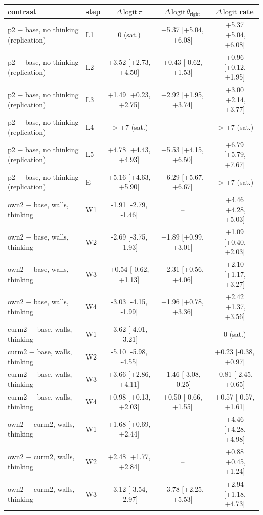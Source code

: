 \begin{tabular}{llccc}
\toprule
contrast & step & $\Delta\,\mathrm{logit}\,\pi$ & $\Delta\,\mathrm{logit}\,\theta_{\text{right}}$ & $\Delta\,\mathrm{logit}$ rate \\
\midrule
p2 $-$ base, no thinking (replication) & L1 & 0 (sat.) & +5.37 [+5.04, +6.08] & +5.37 [+5.04, +6.08] \\
p2 $-$ base, no thinking (replication) & L2 & +3.52 [+2.73, +4.50] & +0.43 [-0.62, +1.53] & +0.96 [+0.12, +1.95] \\
p2 $-$ base, no thinking (replication) & L3 & +1.49 [+0.23, +2.75] & +2.92 [+1.95, +3.74] & +3.00 [+2.14, +3.77] \\
p2 $-$ base, no thinking (replication) & L4 & $>$+7 (sat.) & -- & $>$+7 (sat.) \\
p2 $-$ base, no thinking (replication) & L5 & +4.78 [+4.43, +4.93] & +5.53 [+4.15, +6.50] & +6.79 [+5.79, +7.67] \\
p2 $-$ base, no thinking (replication) & E & +5.16 [+4.63, +5.90] & +6.29 [+5.67, +6.67] & $>$+7 (sat.) \\
\midrule
own2 $-$ base, walls, thinking & W1 & -1.91 [-2.79, -1.46] & -- & +4.46 [+4.28, +5.03] \\
own2 $-$ base, walls, thinking & W2 & -2.69 [-3.75, -1.93] & +1.89 [+0.99, +3.01] & +1.09 [+0.40, +2.03] \\
own2 $-$ base, walls, thinking & W3 & +0.54 [-0.62, +1.13] & +2.31 [+0.56, +4.06] & +2.10 [+1.17, +3.27] \\
own2 $-$ base, walls, thinking & W4 & -3.03 [-4.15, -1.99] & +1.96 [+0.78, +3.36] & +2.42 [+1.37, +3.56] \\
\midrule
curm2 $-$ base, walls, thinking & W1 & -3.62 [-4.01, -3.21] & -- & 0 (sat.) \\
curm2 $-$ base, walls, thinking & W2 & -5.10 [-5.98, -4.55] & -- & +0.23 [-0.38, +0.97] \\
curm2 $-$ base, walls, thinking & W3 & +3.66 [+2.86, +4.11] & -1.46 [-3.08, -0.25] & -0.81 [-2.45, +0.65] \\
curm2 $-$ base, walls, thinking & W4 & +0.98 [+0.13, +2.03] & +0.50 [-0.66, +1.55] & +0.57 [-0.57, +1.61] \\
\midrule
own2 $-$ curm2, walls, thinking & W1 & +1.68 [+0.69, +2.44] & -- & +4.46 [+4.28, +4.98] \\
own2 $-$ curm2, walls, thinking & W2 & +2.48 [+1.77, +2.84] & -- & +0.88 [+0.45, +1.24] \\
own2 $-$ curm2, walls, thinking & W3 & -3.12 [-3.54, -2.97] & +3.78 [+2.25, +5.53] & +2.94 [+1.18, +4.73] \\

\end{tabular}
